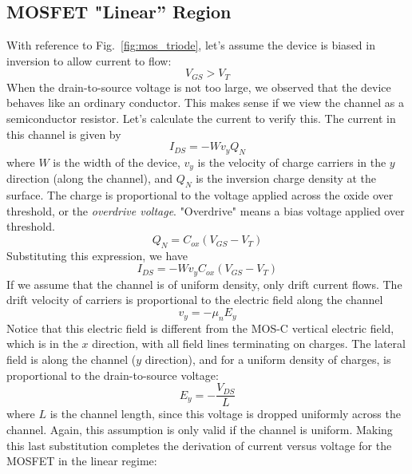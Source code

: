 \subsection{MOSFET "Linear'' Region}
With reference to Fig.~\ref{fig:mos_triode}, let's assume the device is biased in inversion to allow current to flow:
    \begin{equation}
        {V_{GS}} > {V_{T}}
    \end{equation}
When the drain-to-source voltage is not too large, we observed that the device behaves like an ordinary conductor.  This makes sense if we view the channel as a semiconductor resistor.  Let's calculate the current to verify this.  
The current in this channel is given by
    \begin{equation}
        {I_{DS}} =  - W{v_y}{Q_N}
    \end{equation}
where $W$ is the width of the device, $v_y$ is the velocity of charge carriers in the $y$ direction (along the channel), and $Q_N$ is the inversion charge density at the surface.  
The charge is proportional to the voltage applied across the oxide over threshold, or the \emph{overdrive voltage}.  "Overdrive" means a bias voltage applied over threshold.
    \begin{equation}
        {Q_N} = {C_{ox}}({V_{GS}} - {V_{T}})
    \end{equation}
Substituting this expression, we have
    \begin{equation}
        {I_{DS}} =  - W{v_y}{C_{ox}}({V_{GS}} - {V_{T}})
    \end{equation}
If we assume that the channel is of uniform density, only drift current flows.  The drift velocity of carriers is proportional to the electric field along the channel
    \begin{equation}
        {v_y} =  - {\mu _n}{E_y}
    \end{equation}
Notice that this electric field is different from the MOS-C vertical electric field, which is in the $x$ direction, with all field lines terminating on charges.  The lateral field is along the channel ($y$ direction), and for a uniform density of charges, is proportional to the drain-to-source voltage:
    \begin{equation}
        {E_y} =  - \frac{{{V_{DS}}}}{L}
    \end{equation}
where $L$ is the channel length, since this voltage is dropped uniformly across the channel.  Again, this assumption is only valid if the channel is uniform.  Making this last substitution completes the derivation of current versus voltage for the MOSFET in the linear regime:
